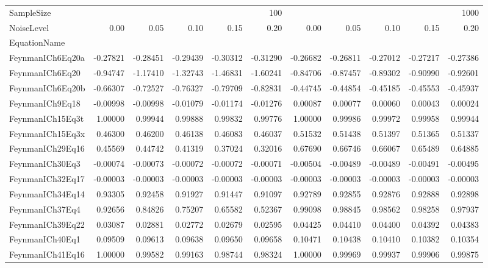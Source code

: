\begin{tabular}{lrrrrrrrrrr}
\toprule
SampleSize & \multicolumn{5}{r}{100} & \multicolumn{5}{r}{1000} \\
NoiseLevel & 0.00 & 0.05 & 0.10 & 0.15 & 0.20 & 0.00 & 0.05 & 0.10 & 0.15 & 0.20 \\
EquationName &  &  &  &  &  &  &  &  &  &  \\
\midrule
FeynmanICh6Eq20a & -0.27821 & -0.28451 & -0.29439 & -0.30312 & -0.31290 & -0.26682 & -0.26811 & -0.27012 & -0.27217 & -0.27386 \\
FeynmanICh6Eq20 & -0.94747 & -1.17410 & -1.32743 & -1.46831 & -1.60241 & -0.84706 & -0.87457 & -0.89302 & -0.90990 & -0.92601 \\
FeynmanICh6Eq20b & -0.66307 & -0.72527 & -0.76327 & -0.79709 & -0.82831 & -0.44745 & -0.44854 & -0.45185 & -0.45553 & -0.45937 \\
FeynmanICh9Eq18 & -0.00998 & -0.00998 & -0.01079 & -0.01174 & -0.01276 & 0.00087 & 0.00077 & 0.00060 & 0.00043 & 0.00024 \\
FeynmanICh15Eq3t & 1.00000 & 0.99944 & 0.99888 & 0.99832 & 0.99776 & 1.00000 & 0.99986 & 0.99972 & 0.99958 & 0.99944 \\
FeynmanICh15Eq3x & 0.46300 & 0.46200 & 0.46138 & 0.46083 & 0.46037 & 0.51532 & 0.51438 & 0.51397 & 0.51365 & 0.51337 \\
FeynmanICh29Eq16 & 0.45569 & 0.44742 & 0.41319 & 0.37024 & 0.32016 & 0.67690 & 0.66746 & 0.66067 & 0.65489 & 0.64885 \\
FeynmanICh30Eq3 & -0.00074 & -0.00073 & -0.00072 & -0.00072 & -0.00071 & -0.00504 & -0.00489 & -0.00489 & -0.00491 & -0.00495 \\
FeynmanICh32Eq17 & -0.00003 & -0.00003 & -0.00003 & -0.00003 & -0.00003 & -0.00003 & -0.00003 & -0.00003 & -0.00003 & -0.00003 \\
FeynmanICh34Eq14 & 0.93305 & 0.92458 & 0.91927 & 0.91447 & 0.91097 & 0.92789 & 0.92855 & 0.92876 & 0.92888 & 0.92898 \\
FeynmanICh37Eq4 & 0.92656 & 0.84826 & 0.75207 & 0.65582 & 0.52367 & 0.99098 & 0.98845 & 0.98562 & 0.98258 & 0.97937 \\
FeynmanICh39Eq22 & 0.03087 & 0.02881 & 0.02772 & 0.02679 & 0.02595 & 0.04425 & 0.04410 & 0.04400 & 0.04392 & 0.04383 \\
FeynmanICh40Eq1 & 0.09509 & 0.09613 & 0.09638 & 0.09650 & 0.09658 & 0.10471 & 0.10438 & 0.10410 & 0.10382 & 0.10354 \\
FeynmanICh41Eq16 & 1.00000 & 0.99582 & 0.99163 & 0.98744 & 0.98324 & 1.00000 & 0.99969 & 0.99937 & 0.99906 & 0.99875 \\

\end{tabular}
